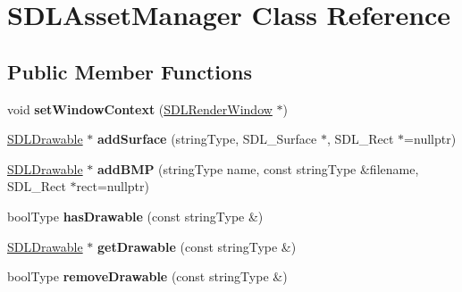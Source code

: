 \hypertarget{classSDLAssetManager}{\section{S\-D\-L\-Asset\-Manager Class Reference}
\label{classSDLAssetManager}
}
\subsection*{Public Member Functions}
\begin{DoxyCompactItemize}
\item 
\hypertarget{classSDLAssetManager_a29a1e3557e56ed15b4226ea8b7a04c39}{void {\bfseries set\-Window\-Context} (\hyperlink{classSDLRenderWindow}{S\-D\-L\-Render\-Window} $\ast$)}\label{classSDLAssetManager_a29a1e3557e56ed15b4226ea8b7a04c39}

\item 
\hypertarget{classSDLAssetManager_afdead8281e50ea52a4983c1932830279}{\hyperlink{classSDLDrawable}{S\-D\-L\-Drawable} $\ast$ {\bfseries add\-Surface} (string\-Type, S\-D\-L\-\_\-\-Surface $\ast$, S\-D\-L\-\_\-\-Rect $\ast$=nullptr)}\label{classSDLAssetManager_afdead8281e50ea52a4983c1932830279}

\item 
\hypertarget{classSDLAssetManager_a60e9bd7bde41894ed4050eef2a47b110}{\hyperlink{classSDLDrawable}{S\-D\-L\-Drawable} $\ast$ {\bfseries add\-B\-M\-P} (string\-Type name, const string\-Type \&filename, S\-D\-L\-\_\-\-Rect $\ast$rect=nullptr)}\label{classSDLAssetManager_a60e9bd7bde41894ed4050eef2a47b110}

\item 
\hypertarget{classSDLAssetManager_a674f83ea0f42ef5a4d6e31da95e405be}{bool\-Type {\bfseries has\-Drawable} (const string\-Type \&)}\label{classSDLAssetManager_a674f83ea0f42ef5a4d6e31da95e405be}

\item 
\hypertarget{classSDLAssetManager_a18893e17e1599250d00a2d11cda8cfec}{\hyperlink{classSDLDrawable}{S\-D\-L\-Drawable} $\ast$ {\bfseries get\-Drawable} (const string\-Type \&)}\label{classSDLAssetManager_a18893e17e1599250d00a2d11cda8cfec}

\item 
\hypertarget{classSDLAssetManager_ad96a1246a260bbcce2a48c1affbad76b}{bool\-Type {\bfseries remove\-Drawable} (const string\-Type \&)}\label{classSDLAssetManager_ad96a1246a260bbcce2a48c1affbad76b}

\end{DoxyCompactItemize}
